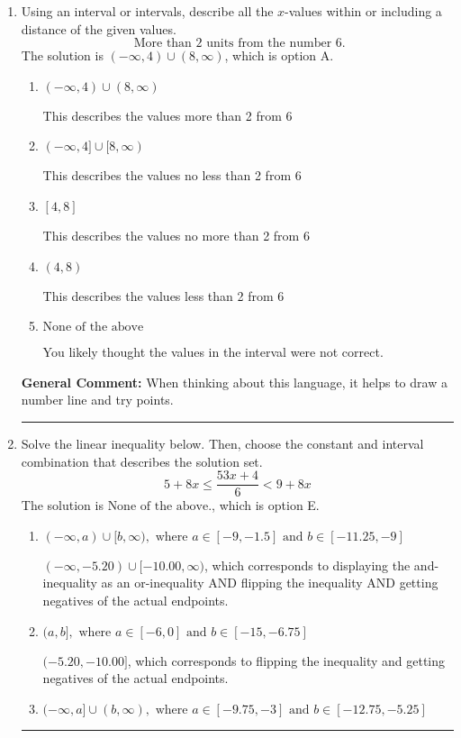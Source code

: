 \documentclass{extbook}[14pt]
\newcommand{\litem}[1]{\item #1

\rule{\textwidth}{0.4pt}}
\begin{document}
\begin{enumerate}
{\textbf{General Comment:} Remember that less/greater than or equal to includes the endpoint, while less/greater do not. Also, remember that you need to flip the inequality when you multiply or divide by a negative.
}
\litem{
Using an interval or intervals, describe all the $x$-values within or including a distance of the given values.
\[ \text{ More than } 2 \text{ units from the number } 6. \]The solution is \( (-\infty, 4) \cup (8, \infty) \), which is option A.\begin{enumerate}[label=\Alph*.]
\item \( (-\infty, 4) \cup (8, \infty) \)

This describes the values more than 2 from 6
\item \( (-\infty, 4] \cup [8, \infty) \)

This describes the values no less than 2 from 6
\item \( [4, 8] \)

This describes the values no more than 2 from 6
\item \( (4, 8) \)

This describes the values less than 2 from 6
\item \( \text{None of the above} \)

You likely thought the values in the interval were not correct.
\end{enumerate}

\textbf{General Comment:} When thinking about this language, it helps to draw a number line and try points.
}
\litem{
Solve the linear inequality below. Then, choose the constant and interval combination that describes the solution set.
\[ 5 + 8 x \leq \frac{53 x + 4}{6} < 9 + 8 x \]The solution is \( \text{None of the above.} \), which is option E.\begin{enumerate}[label=\Alph*.]
\item \( (-\infty, a) \cup [b, \infty), \text{ where } a \in [-9, -1.5] \text{ and } b \in [-11.25, -9] \)

$(-\infty, -5.20) \cup [-10.00, \infty)$, which corresponds to displaying the and-inequality as an or-inequality AND flipping the inequality AND getting negatives of the actual endpoints.
\item \( (a, b], \text{ where } a \in [-6, 0] \text{ and } b \in [-15, -6.75] \)

$(-5.20, -10.00]$, which corresponds to flipping the inequality and getting negatives of the actual endpoints.
\item \( (-\infty, a] \cup (b, \infty), \text{ where } a \in [-9.75, -3] \text{ and } b \in [-12.75, -5.25] \)


\end{enumerate}}
\end{enumerate}
\end{document}
